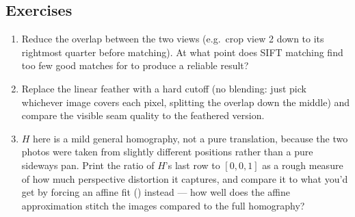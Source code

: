 \subsection*{Exercises}
\begin{enumerate}
  \item Reduce the overlap between the two views (e.g.\ crop view 2 down to its rightmost quarter before matching). At what point does SIFT matching find too few good matches for  to produce a reliable result?
  \item Replace the linear feather with a hard cutoff (no blending: just pick whichever image covers each pixel, splitting the overlap down the middle) and compare the visible seam quality to the feathered version.
  \item $H$ here is a mild general homography, not a pure translation, because the two photos were taken from slightly different positions rather than a pure sideways pan. Print the ratio of $H$'s last row to $[0,0,1]$ as a rough measure of how much perspective distortion it captures, and compare it to what you'd get by forcing an affine fit () instead --- how well does the affine approximation stitch the images compared to the full homography?
\end{enumerate}

\vfill
{}
